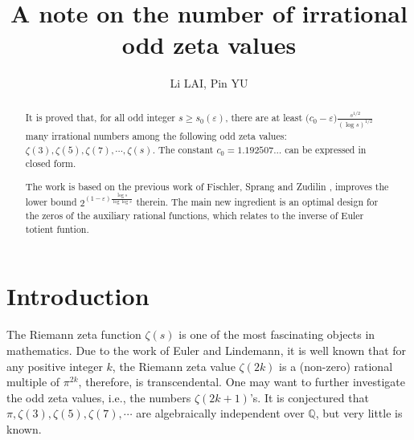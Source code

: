 \documentclass[11pt]{amsart}
\numberwithin{equation}{section}
\begin{document}
\title {A note on the number of irrational odd zeta values}

\author{Li LAI, Pin YU}

\address{Department of Mathematics and Yau Mathematical Sciences Center, Tsinghua University\\ Beijing, China}
\maketitle

\begin{abstract}
It is proved that, for all odd integer $s \geqslant s_0(\varepsilon)$, there are at least $\big( c_0 - \varepsilon \big) \frac{s^{1/2}}{(\log s)^{1/2}} $ many irrational numbers among the following odd zeta values: $\zeta(3),\zeta(5),\zeta(7),\cdots,\zeta(s)$. The constant $\displaystyle c_0 = 1.192507\ldots$ can be expressed in closed form.

The work is based on the previous work of Fischler, Sprang and Zudilin \cite{FSZ2019}, improves the lower bound $2^{(1-\varepsilon)\frac{\log s}{\log\log s}}$ therein. The main new ingredient is an optimal design for the zeros of the auxiliary rational functions, which relates to the inverse of Euler totient funtion.
\end{abstract}

\tableofcontents



\section{Introduction}
\label{Chapter_Introduction}

The Riemann zeta function $\zeta(s)$ is one of the most fascinating objects in mathematics. Due to the work of Euler and Lindemann, it is well known that for any positive integer $k$, the Riemann zeta value $\zeta(2k)$ is a (non-zero) rational multiple of $\pi^{2k}$, therefore, is transcendental. One may want to further investigate the odd zeta values, i.e., the numbers $\zeta(2k+1)$'s. It is conjectured that $\pi, \zeta(3), \zeta(5),\zeta(7),\cdots$ are algebraically independent over $\mathbb{Q}$, but very little is known.
\end{document}
